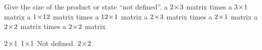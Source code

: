 
\begin{Exercise}[
name={},
title={}, 
difficulty=0,
origin={\cite{JH}}]
Give the size of the product or state ``not defined''.
\Question a \( 2 \! \times \! 3 \) matrix times a \( 3 \! \times \! 1 \) matrix
\Question a \( 1 \! \times \! 12 \) matrix times a \( 12 \! \times \! 1 \) matrix
\Question a \( 2 \! \times \! 3 \) matrix times a \( 2 \! \times \! 1 \) matrix
\Question a \( 2 \! \times \! 2 \) matrix times a \( 2 \! \times \! 2 \) matrix
\end{Exercise}

\begin{Answer}
\Question \( 2 \! \times \! 1 \)
\Question \( 1 \! \times \! 1 \)
\Question Not defined.
\Question \( 2 \! \times \! 2 \)
\end{Answer}
